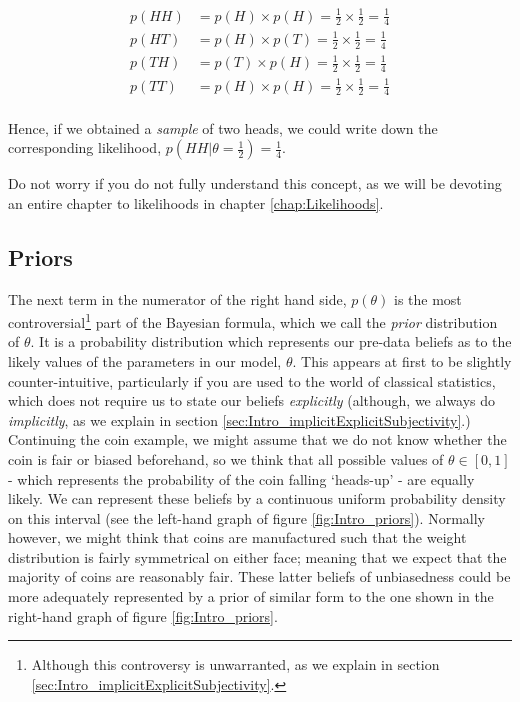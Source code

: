 \documentclass[11pt,fullpage]{book}
\begin{document}
\begin{align}
p(HH) &= p(H)\times p(H) = \frac{1}{2} \times \frac{1}{2} = \frac{1}{4}\\
p(HT) &= p(H)\times p(T) = \frac{1}{2} \times \frac{1}{2} = \frac{1}{4}\\
p(TH) &= p(T)\times p(H) = \frac{1}{2} \times \frac{1}{2} = \frac{1}{4}\\
p(TT) &= p(H)\times p(H) = \frac{1}{2} \times \frac{1}{2} = \frac{1}{4}\\
\end{align}

Hence, if we obtained a \textit{sample} of two heads, we could write down the corresponding likelihood, $p(HH|\theta=\frac{1}{2})=\frac{1}{4}$.

Do not worry if you do not fully understand this concept, as we will be devoting an entire chapter to likelihoods in chapter \ref{chap:Likelihoods}.

\subsection{Priors}\label{sec:Intro_priors}
The next term in the numerator of the right hand side, $p(\theta)$ is the most controversial\footnote{Although this controversy is unwarranted, as we explain in section \ref{sec:Intro_implicitExplicitSubjectivity}.} part of the Bayesian formula, which we call the \textit{prior} distribution of $\theta$. It is a probability distribution which represents our pre-data beliefs as to the likely values of the parameters in our model, $\theta$. This appears at first to be slightly counter-intuitive, particularly if you are used to the world of classical statistics, which does not require us to state our beliefs \textit{explicitly} (although, we always do \textit{implicitly}, as we explain in section \ref{sec:Intro_implicitExplicitSubjectivity}.) Continuing the coin example, we might assume that we do not know whether the coin is fair or biased beforehand, so we think that all possible values of $\theta\in[0,1]$ - which represents the probability of the coin falling `heads-up' - are equally likely. We can represent these beliefs by a continuous uniform probability density on this interval (see the left-hand graph of figure \ref{fig:Intro_priors}). Normally however, we might think that coins are manufactured such that the weight distribution is fairly symmetrical on either face; meaning that we expect that the majority of coins are reasonably fair. These latter beliefs of unbiasedness could be more adequately represented by a prior of similar form to the one shown in the right-hand graph of figure \ref{fig:Intro_priors}.
\end{document}
